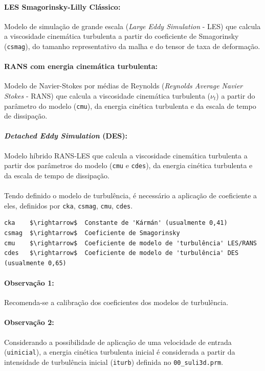 \documentclass[12pt, a4paper]{article}
\begin{document}
\paragraph{LES Smagorinsky-Lilly Clássico:} Modelo de simulação de grande escala (\textit{Large Eddy Simulation} - LES) que calcula a viscosidade cinemática turbulenta a partir do coeficiente de Smagorinsky (\verb|csmag|), do tamanho representativo da malha e do tensor de taxa de deformação.
\paragraph{RANS com energia cinemática turbulenta:} Modelo de Navier-Stokes por médias de Reynolds (\textit{Reynolds Average Navier Stokes} - RANS) que calcula a viscosidade cinemática turbulenta ($\nu_{t}$) a partir do parâmetro do modelo (\verb|cmu|), da energia cinética turbulenta e da escala de tempo de dissipação.
\paragraph{\textit{Detached Eddy Simulation} (DES):} Modelo híbrido RANS-LES que calcula a viscosidade cinemática turbulenta a partir dos parâmetros do modelo (\verb|cmu| e \verb|cdes|), da energia cinética turbulenta e da escala de tempo de dissipação. 

\paragraph{} Tendo definido o modelo de turbulência, é necessário a aplicação de coeficiente a eles, definidos por \verb|cka|, \verb|csmag|, \verb|cmu|, \verb|cdes|. 

\begin{lstlisting}[escapeinside=''] 
cka    $\rightarrow$  Constante de 'Kármán' (usualmente 0,41)
csmag  $\rightarrow$  Coeficiente de Smagorinsky
cmu	   $\rightarrow$  Coeficiente de modelo de 'turbulência' LES/RANS
cdes   $\rightarrow$  Coeficiente de modelo de 'turbulência' DES (usualmente 0,65)
\end{lstlisting}

\paragraph{Observação 1:}  Recomenda-se a calibração dos coeficientes dos modelos de turbulência. 

\paragraph{Observação 2:}  Considerando a possibilidade de aplicação de uma velocidade de entrada (\verb|uinicial|), a energia cinética turbulenta inicial é considerada a partir da intensidade de turbulência inicial (\verb|iturb|) definida no \verb|00_suli3d.prm|.
\end{document}
